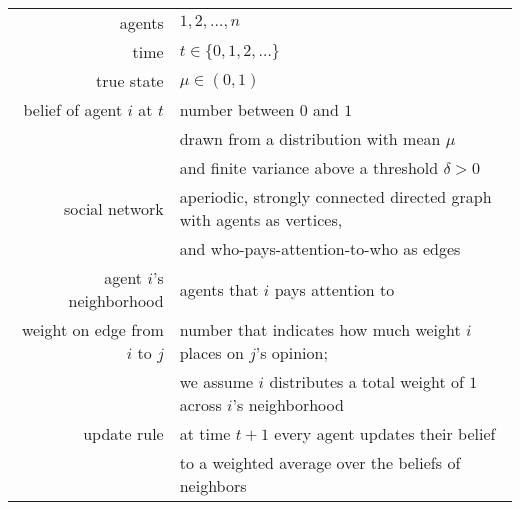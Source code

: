 \documentclass[preview, border={0pt 5pt 0pt 1pt}, varwidth=18cm]{standalone} %
\begin{document}
    \begin{table}
        \begin{tabular}{rl}
            agents & \(1, 2, \dots , n\) \\
            [0.4em]
            time & \(t \in \{0, 1, 2, \dots \} \) \\
            [0.4em]
            true state & \(\mu \in (0, 1)\) \\
            [0.4em]
            belief of agent \(i\) at \(t\) & number between \(0\) and \(1\)\\
                                           & drawn from a distribution with mean \(\mu\) \\
                                           & and finite variance above a threshold \(\delta > 0\)\\
            [0.4em]
            social network & aperiodic, strongly connected directed graph with agents as vertices, \\ 
                           & and who-pays-attention-to-who as edges \\
            [0.4em]
            agent \(i\)'s neighborhood & agents that \(i\) pays attention to \\
            [0.4em]
            weight on edge from \(i\) to \(j\) & number that indicates how much weight \(i\) places on \(j\)'s opinion;\\ 
                                               & we assume \(i\) distributes a total weight of \(1\) across \(i\)'s neighborhood\\
            [0.4em]
            update rule & at time \(t+1\) every agent updates their belief \\ 
                        & to a weighted average over the beliefs of neighbors
        \end{tabular}
    \end{table}
\end{document}
